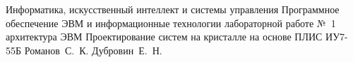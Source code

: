 \documentclass{bmstu}
\begin{document}
\makereporttitle
{Информатика, искусственный интеллект и системы управления} %
{Программное обеспечение ЭВМ и информационные технологии} %
{лабораторной работе №~1} %
{архитектура ЭВМ} %
{Проектирование систем на кристалле на основе ПЛИС} %
{} %
{ИУ7-55Б} %
{Романов~С.~К.} %
{Дубровин~Е.~Н.} %





%
\end{document}
